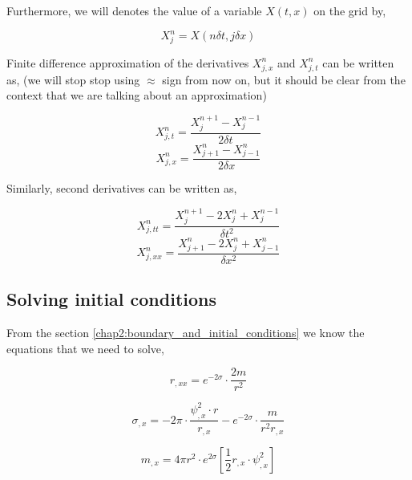 Furthermore, we will denotes the value of a variable $X(t,x)$ on the grid by,

\begin{equation}
    X^{n}_{j}  = X(n \delta t, j \delta x)
\end{equation}

Finite difference approximation of the derivatives $X^n_{j,x}$ and $X^n_{j,t}$ can be written as, (we will stop stop using $\approx$ sign from now on, but it should be clear from the context that we are talking about an approximation)

\begin{equation}
    X^n_{j,t} = \frac{X^{n+1}_{j} - X^{n-1}_{j}}{2 \delta t}
\end{equation}
\begin{equation}
    X^n_{j,x} = \frac{X^n_{j+1} - X^n_{j-1}}{2 \delta x}
\end{equation}

Similarly, second derivatives can be written as,


\begin{equation}
    X^n_{j,tt} = \frac{X^{n+1}_{j} -2X^n_j + X^{n-1}_{j}}{\delta t^2}
\end{equation}
\begin{equation}
    X^n_{j,xx} = \frac{X^n_{j+1} -2 X^n_j+ X^n_{j-1}}{\delta x^2}
\end{equation}




\subsection{Solving initial conditions}

From the section \ref{chap2:boundary_and_initial_conditions} we know the equations that we need to solve,


\begin{equation}
    r_{, x x}=e^{-2 \sigma} \cdot \frac{2 m}{r^{2}}
    \label{eqn:r_ic}
\end{equation}


\begin{equation}
    \sigma_{, x}= -2 \pi \cdot  \frac{\psi_{, x}^{2} \cdot r}{r_{,x}}- e^{-2 \sigma} \cdot \frac{ m}{r^{2}r_{, x}}
    \label{eqn:sigma_ic}
\end{equation}

\begin{equation}
    m_{, x}=4 \pi r^{2} \cdot e^{2 \sigma}\left[\frac{1}{2} r_{, x} \cdot \psi_{, x}^{2} \right]
    \label{eqn:m_ic}
\end{equation}


